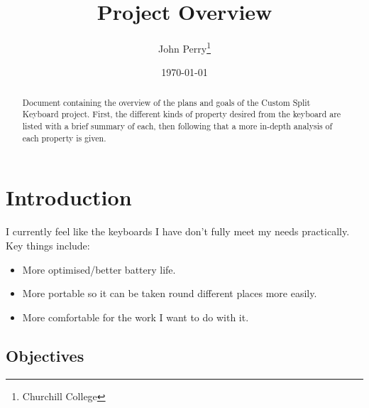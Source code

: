 \documentclass[11pt,a4paper]{article}
\title{Project Overview}
\author{John Perry\thanks{Churchill College}}
\date{\today}
\numberwithin{equation}{section}
\begin{document}
\pagestyle{empty}

\maketitle

\pagestyle{fancy}

\begin{abstract}
    Document containing the overview of the plans and goals of the Custom Split Keyboard project. First, the different kinds of property desired from the keyboard are listed with a brief summary of each, then following that a more in-depth analysis of each property is given.
\end{abstract}

\section{Introduction}
I currently feel like the keyboards I have don't fully meet my needs practically. Key things include:
\begin{itemize}
    \item More optimised/better battery life.
    \item More portable so it can be taken round different places more easily.
    \item More comfortable for the work I want to do with it.
\end{itemize}

\subsection{Objectives}
\end{document}
